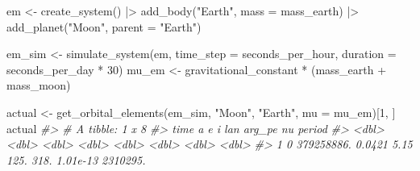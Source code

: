 \documentclass[
  10.5pt,
  letterpaper,
]{scrbook}
\newenvironment{Shaded}{\begin{snugshade}}{\end{snugshade}}
\newcommand{\AttributeTok}[1]{\textcolor[rgb]{0.00,0.00,0.00}{#1}}
\newcommand{\CommentTok}[1]{\textcolor[rgb]{0.00,0.00,0.00}{\textit{#1}}}
\newcommand{\DecValTok}[1]{\textcolor[rgb]{0.00,0.00,0.00}{#1}}
\newcommand{\FloatTok}[1]{\textcolor[rgb]{0.00,0.00,0.00}{#1}}
\newcommand{\FunctionTok}[1]{\textcolor[rgb]{0.00,0.00,0.00}{#1}}
\newcommand{\NormalTok}[1]{\textcolor[rgb]{0.00,0.00,0.00}{#1}}
\newcommand{\OtherTok}[1]{\textcolor[rgb]{0.00,0.00,0.00}{#1}}
\newcommand{\SpecialCharTok}[1]{\textcolor[rgb]{0.00,0.00,0.00}{#1}}
\newcommand{\StringTok}[1]{\textcolor[rgb]{0.00,0.00,0.00}{#1}}
\theoremstyle{definition}
\theoremstyle{plain}
\theoremstyle{remark}
\begin{document}
\begin{Shaded}
\begin{Highlighting}[]
\NormalTok{em }\OtherTok{\textless{}{-}} \FunctionTok{create\_system}\NormalTok{() }\SpecialCharTok{|\textgreater{}}
  \FunctionTok{add\_body}\NormalTok{(}\StringTok{"Earth"}\NormalTok{, }\AttributeTok{mass =}\NormalTok{ mass\_earth) }\SpecialCharTok{|\textgreater{}}
  \FunctionTok{add\_planet}\NormalTok{(}\StringTok{"Moon"}\NormalTok{, }\AttributeTok{parent =} \StringTok{"Earth"}\NormalTok{)}

\NormalTok{em\_sim }\OtherTok{\textless{}{-}} \FunctionTok{simulate\_system}\NormalTok{(em, }\AttributeTok{time\_step =}\NormalTok{ seconds\_per\_hour,}
                          \AttributeTok{duration =}\NormalTok{ seconds\_per\_day }\SpecialCharTok{*} \DecValTok{30}\NormalTok{)}
\NormalTok{mu\_em  }\OtherTok{\textless{}{-}}\NormalTok{ gravitational\_constant }\SpecialCharTok{*}\NormalTok{ (mass\_earth }\SpecialCharTok{+}\NormalTok{ mass\_moon)}

\NormalTok{actual }\OtherTok{\textless{}{-}} \FunctionTok{get\_orbital\_elements}\NormalTok{(em\_sim, }\StringTok{"Moon"}\NormalTok{, }\StringTok{"Earth"}\NormalTok{, }\AttributeTok{mu =}\NormalTok{ mu\_em)[}\DecValTok{1}\NormalTok{, ]}
\NormalTok{actual}
\CommentTok{\#\textgreater{} \# A tibble: 1 x 8}
\CommentTok{\#\textgreater{}    time          a      e     i   lan arg\_pe       nu   period}
\CommentTok{\#\textgreater{}   \textless{}dbl\textgreater{}      \textless{}dbl\textgreater{}  \textless{}dbl\textgreater{} \textless{}dbl\textgreater{} \textless{}dbl\textgreater{}  \textless{}dbl\textgreater{}    \textless{}dbl\textgreater{}    \textless{}dbl\textgreater{}}
\CommentTok{\#\textgreater{} 1     0 379258886. 0.0421  5.15  125.   318. 1.01e{-}13 2310295.}
\end{Highlighting}
\end{Shaded}

\begin{Shaded}
\end{Shaded}
\end{document}
